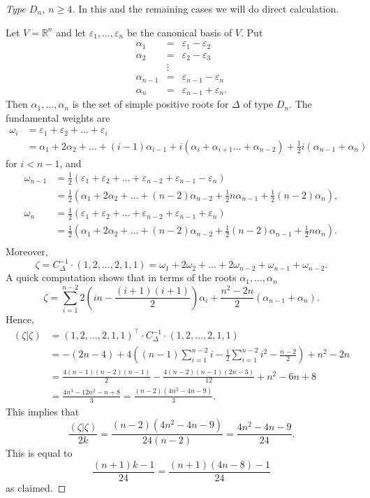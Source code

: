 \documentclass[11pt,a4paper]{amsart}
\theoremstyle{definition}
\begin{document}
\begin{proof}[Type $D_n$, $n \geq 4$]
In this and the remaining cases we will do direct calculation. 

Let $V=\mathbb{R}^n$ and let $\varepsilon_1, \dots, \varepsilon_n$ be the canonical basis of $V$. Put
\[
\begin{array}{rcl}
\alpha_1 & = &\varepsilon_1- \varepsilon_2 \\
\alpha_2 & = &\varepsilon_2- \varepsilon_3 \\
& \vdots &  \\
\alpha_{n-1} & = &\varepsilon_{n-1} - \varepsilon_n \\
\alpha_{n} & =  & \varepsilon_{n-1} + \varepsilon_n.
\end{array}
\]
Then $\alpha_1,\dots,\alpha_n$ is the set of simple positive roots for $\Delta$ of type $D_n$. The fundamental weights are
\[ 
\begin{aligned}
\omega_i & = \varepsilon_1 + \varepsilon_2 + \dots + \varepsilon_i\\
& = \alpha_1 +2 \alpha_2 + \dots + (i-1)\alpha_{i-1} +i(\alpha_i+\alpha_{i+1}\dots+\alpha_{n-2})+\frac{1}{2}i(\alpha_{n-1}+\alpha_{n}) 
\end{aligned}
\]
for $i < n-1$, and
\[
\begin{aligned}
\omega_{n-1} & = \frac{1}{2}(\varepsilon_1 + \varepsilon_2 + \dots + \varepsilon_{n-2} +\varepsilon_{n-1}-\varepsilon_{n}) \\
& = \frac{1}{2}(\alpha_1 + 2 \alpha_2 + \dots + (n-2)\alpha_{n-2}+\frac{1}{2}n\alpha_{n-1}+\frac{1}{2}(n-2)\alpha_n), \\
\omega_{n} & = \frac{1}{2}(\varepsilon_1 + \varepsilon_2 + \dots + \varepsilon_{n-2} +\varepsilon_{n-1}+\varepsilon_{n}) \\
& = \frac{1}{2}(\alpha_1 + 2 \alpha_2 + \dots + (n-2)\alpha_{n-2}+\frac{1}{2}(n-2)\alpha_{n-1}+\frac{1}{2}n\alpha_n). \\
\end{aligned}
\]
Moreover,
\[ \zeta = C_{\Delta}^{-1} \cdot (1,2,\dots,2,1,1) = \omega_1 + 2\omega_{2} + \dots + 2 \omega_{n-2}+ \omega_{n-1} + \omega_{n-2}. \]
A quick computation shows that in terms of the roots $\alpha_1,\dots,\alpha_n$
\[ \zeta= \sum_{i=1}^{n-2} 2\left(in - \frac{(i+1)(i+1)}{2}\right)\alpha_i+ \frac{n^2-2n}{2}(\alpha_{n-1}+\alpha_{n}). \]
Hence,
\[ 
\begin{aligned}
(\zeta|\zeta) & = (1,2,\dots,2,1,1)^{\top} \cdot C_{\Delta}^{-1} \cdot (1,2,\dots,2,1,1)  \\
& = -(2n-4)+4 \left((n-1)\sum_{i=1}^{n-2}i -\frac{1}{2}\sum_{i=1}^{n-2}i^2 - \frac{n-2}{2}\right)+n^2-2n \\
& = \frac{4(n-1)(n-2)(n-1)}{2}-\frac{4(n-2)(n-1)(2n-3)}{12}+n^2-6n+8 \\
& = \frac{4 n^3 - 12n^2  -n+ 8}{3}=\frac{(n-2)(4n^2-4n-9)}{3}.
\end{aligned}
\]
This implies that
\[ \frac{(\zeta|\zeta)}{2k}=\frac{(n-2)(4n^2-4n-9)}{24(n-2)}=\frac{4n^2-4n-9}{24}. \]
This is equal to 
\[ \frac{(n+1)k-1}{24}=\frac{(n+1)(4n-8)-1}{24}\]
as claimed.
\end{proof}
\end{document}
